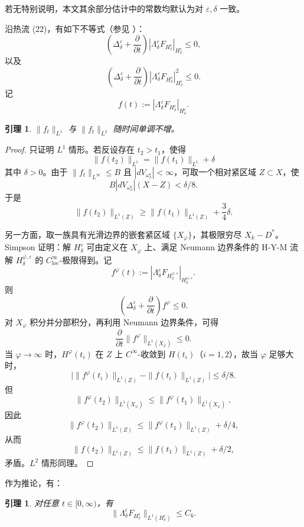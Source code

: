 \documentclass[12pt,a4paper]{article}
\newtheorem{lemma}[theorem]{引理}
\begin{document}
若无特别说明，本文其余部分估计中的常数均默认为对 \(\varepsilon,\delta\) 一致。

沿热流 (22)，有如下不等式（参见 \cite{Donaldson1}）：
\[
\left(\Delta^\varepsilon_\delta+\frac{\partial}{\partial t}\right)
|\Lambda^\varepsilon_\delta F_{H^\varepsilon_\delta}|_{H^\varepsilon_\delta}
\le 0,
\]
以及
\[
\left(\Delta^\varepsilon_\delta+\frac{\partial}{\partial t}\right)
|\Lambda^\varepsilon_\delta F_{H^\varepsilon_\delta}|_{H^\varepsilon_\delta}^2
\le 0.
\]
记
\[
f(t):=|\Lambda^\varepsilon_\delta F_{H^\varepsilon_\delta}|_{H^\varepsilon_\delta}.
\]

\begin{lemma}
\(\|f_t\|_{L^1}\) 与 \(\|f_t\|_{L^2}\) 随时间单调不增。
\end{lemma}

\begin{proof}
只证明 \(L^1\) 情形。若反设存在 \(t_2>t_1\)，使得
\[
\|f(t_2)\|_{L^1}=\|f(t_1)\|_{L^1}+\delta
\]
其中 \(\delta>0\)。由于 \(\|f_t\|_{L^\infty}\le B\) 且 \(|dV_{\omega^\varepsilon_\delta}|<\infty\)，可取一个相对紧区域 \(Z\subset X\)，使
\[
B|dV_{\omega^\varepsilon_\delta}|(X-Z)<\delta/8.
\]
于是
\[
\|f(t_2)\|_{L^1(Z)}\ge \|f(t_1)\|_{L^1(Z)}+\frac34\delta.
\]

另一方面，取一族具有光滑边界的嵌套紧区域 \(\{X_\varphi\}\)，其极限穷尽 \(X_k-D^*\)。Simpson \cite[Section 6]{SimpsonConstruct} 证明：解 \(H^\varepsilon_\delta\) 可由定义在 \(X_\varphi\) 上、满足 Neumann 边界条件的 H-Y-M 流解 \(H^{\varphi,\varepsilon}_\delta\) 的 \(C^\infty_{\mathrm{loc}}\)-极限得到。记
\[
f^\varphi(t):=
|\Lambda^\varepsilon_\delta F_{H^{\varphi,\varepsilon}_\delta}|_{H^{\varphi,\varepsilon}_\delta}.
\]
则
\[
\left(\Delta^\varepsilon_\delta+\frac{\partial}{\partial t}\right)f^\varphi\le 0.
\]
对 \(X_\varphi\) 积分并分部积分，再利用 Neumann 边界条件，可得
\[
\frac{\partial}{\partial t}\|f^\varphi\|_{L^1(X_\varphi)}\le 0.
\]
当 \(\varphi\to\infty\) 时，\(H^\varphi(t_i)\) 在 \(Z\) 上 \(C^\infty\)-收敛到 \(H(t_i)\)（\(i=1,2\)），故当 \(\varphi\) 足够大时，
\[
\bigl|\|f^\varphi(t_i)\|_{L^1(Z)}-\|f(t_i)\|_{L^1(Z)}\bigr|\le \delta/8.
\]
但
\[
\|f^\varphi(t_2)\|_{L^1(X_\varphi)}\le \|f^\varphi(t_1)\|_{L^1(X_\varphi)},
\]
因此
\[
\|f^\varphi(t_2)\|_{L^1(Z)}\le \|f^\varphi(t_1)\|_{L^1(Z)}+\delta/4,
\]
从而
\[
\|f(t_2)\|_{L^1(Z)}\le \|f(t_1)\|_{L^1(Z)}+\delta/2,
\]
矛盾。\(L^2\) 情形同理。
\end{proof}

作为推论，有：

\begin{lemma}
对任意 \(t\in [0,\infty)\)，有
\[
\|\Lambda^\varepsilon_\delta F_{H^\varepsilon_\delta}\|_{L^1(H^\varepsilon_\delta)}\le C_6.
\]
\end{lemma}
\end{document}
